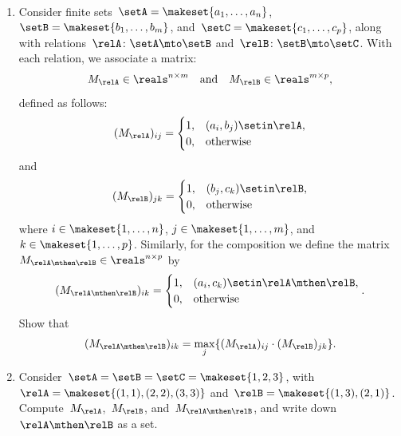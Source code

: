 \begin{gradedexercise}
    \label{ex:ComposingFiniteRelations}
    \
    \begin{enumerate}
        \item Consider finite sets~$\setA = \makeset{a_1, \dots, a_n}$,~$\setB = \makeset{b_1, \dots, b_m}$, and~$\setC = \makeset{c_1, \dots, c_p}$, along with relations~$\relA \colon \setA \mto \setB$ and~$\relB \colon \setB \mto \setC$.
              With each relation, we associate a matrix:
              \[
                  M_{\relA} \in \reals^{n \times m} \quad \text{and} \quad M_{\relB} \in \reals^{m \times p},
              \]
              defined as follows:
              \[
                  (M_{\relA})_{ij} = \begin{cases}
                      1, & (a_i, b_j) \setin \relA, \\
                      0, & \text{otherwise}
                  \end{cases}
              \]
              and
              \[
                  (M_{\relB})_{jk} = \begin{cases}
                      1, & (b_j, c_k) \setin \relB, \\
                      0, & \text{otherwise}
                  \end{cases}
              \]
              where \( i \in \makeset{1, \dots, n} \), \( j \in \makeset{1, \dots, m} \), and \( k \in \makeset{1, \dots, p} \).
              Similarly, for the composition we define the matrix~$M_{\relA \mthen \relB} \in \reals^{n \times p}$ by
              \[
                  (M_{\relA \mthen \relB})_{ik} = \begin{cases}
                      1, & (a_i, c_k) \setin \relA \mthen \relB, \\
                      0, & \text{otherwise}
                  \end{cases}.
              \]
              Show that
              \[
                  (M_{\relA \mthen \relB})_{ik} = \max_{j} \{ (M_{\relA})_{ij} \cdot (M_{\relB})_{jk} \}.
              \]

        \item Consider~$\setA = \setB = \setC = \makeset{1, 2, 3}$, with~$\relA = \makeset{(1,1), (2,2), (3,3)}$ and~$\relB = \makeset{(1,3), (2,1)}$.
              Compute~$M_{\relA}$,~$M_{\relB}$, and~$M_{\relA \mthen \relB}$, and write down~$\relA \mthen \relB$ as a set.
    \end{enumerate}
\end{gradedexercise}

